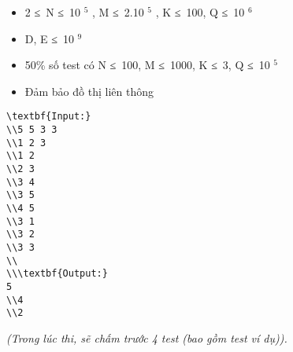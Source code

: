 \begin{itemize}
	\item     2 ≤ N ≤ 10    $^     5    $    , M ≤ 2.10    $^     5    $    , K ≤ 100, Q ≤ 10    $^     6    $
	\item     D, E ≤ 10    $^     9    $
	\item     50\% số test có N ≤ 100, M ≤ 1000, K ≤ 3, Q ≤ 10    $^     5    $
	\item     Đảm bảo đồ thị liên thông   
\end{itemize}
\begin{verbatim}
\textbf{Input:}
\\5 5 3 3
\\1 2 3
\\1 2
\\2 3
\\3 4
\\3 5
\\4 5
\\3 1
\\3 2
\\3 3
\\
\\\textbf{Output:}
5
\\4
\\2\end{verbatim}

\emph{    (Trong lúc thi, sẽ chấm trước 4 test (bao gồm test ví dụ)).   }